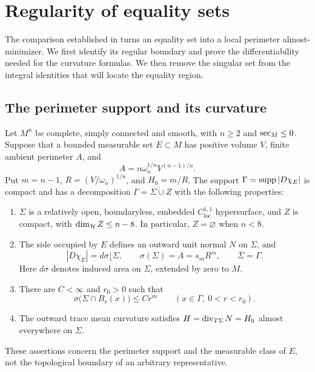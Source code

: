 \section{Regularity of equality sets}
\label{sec:equality-regularity}

The comparison established in  turns an equality
set into a local perimeter almost-minimizer. We first identify its
regular boundary and prove the differentiability needed for the
curvature formulas. We then remove the singular set from the integral
identities that will locate the equality region.

\subsection{The perimeter support and its curvature}

\begin{proposition}
\label{prop:equality-boundary}
Let $M^n$ be complete, simply connected and smooth, with $n\ge2$ and
$\operatorname{sec}_M\le0$. Suppose that a bounded measurable set $E\subset M$ has
positive volume $V$, finite ambient perimeter $A$, and
\[
 A=n\omega_n^{1/n}V^{(n-1)/n}.
\]
Put $m=n-1$, $R=(V/\omega_n)^{1/n}$, and $H_0=m/R$. The support
$\Gamma=\operatorname{supp}|D\chi_E|$ is compact and has a decomposition
$\Gamma=\Sigma\mathbin{\dot\cup}Z$ with the following properties:
\begin{enumerate}
 \item $\Sigma$ is a relatively open, boundaryless, embedded
 $C^{1,1}_{\mathrm{loc}}$ hypersurface, and $Z$ is compact, with
 $\dim_{\mathcal H}Z\le n-8$. In particular, $Z=\varnothing$ when $n<8$.
 \item The side occupied by $E$ defines an outward unit normal $N$
 on $\Sigma$, and
 \begin{equation}
 \label{eq:equality-perimeter-area}
 |D\chi_E|=d\sigma\lfloor\Sigma,
 \qquad \sigma(\Sigma)=A=s_mR^m,
 \qquad \overline\Sigma=\Gamma.
 \end{equation}
 Here $d\sigma$ denotes induced area on $\Sigma$, extended by zero
 to $M$.
 \item There are $C<\infty$ and $r_0>0$ such that
 \begin{equation}
 \label{eq:equality-area-growth}
 \sigma\bigl(\Sigma\cap B_r(x)\bigr)\le Cr^m
 \qquad(x\in\Gamma,\ 0<r<r_0).
 \end{equation}
 \item The outward trace mean curvature satisfies
 $H=\operatorname{div}_{T\Sigma}N=H_0$ almost everywhere on $\Sigma$.
\end{enumerate}
These assertions concern the perimeter support and the measurable
class of $E$, not the topological boundary of an arbitrary
representative.
\end{proposition}

